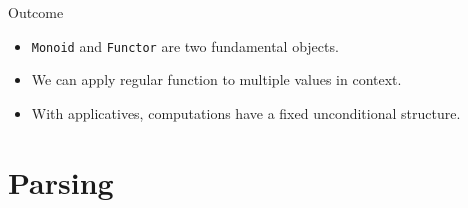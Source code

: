 \documentclass[presentation,aspectratio=169,smaller]{beamer}
\begin{document}
\begin{frame}[label={sec:orgf08607e},fragile]{Outcome}
 \begin{itemize}
\item <1-> \texttt{Monoid} and \texttt{Functor} are two fundamental objects.
\item <2-> We can apply regular function to multiple values in context.
\item <3-> With applicatives, computations have a fixed unconditional structure.
\end{itemize}
\end{frame}

\section{Parsing}
\label{sec:org24cb3ef}
\end{document}
